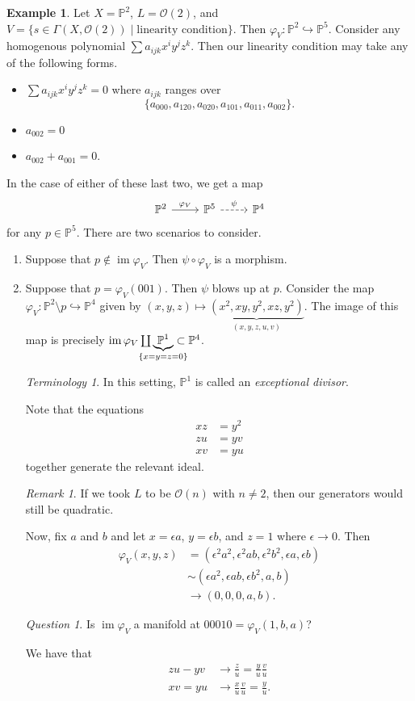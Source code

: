 \documentclass[10pt,letterpaper,cm]{nupset}
\theoremstyle{definition}
\newtheorem{exmp}[defn]{Example}
\theoremstyle{theorem}
\theoremstyle{remark}
\newtheorem{remark}[defn]{Remark}
\newtheorem*{question}{Question}
\newtheorem*{term}{Terminology}
\renewcommand{\O}{\mathcal O}
\renewcommand{\P}{\mathbb P}
\newcommand{\1}{\mathbb{1}}
\newcommand{\0}{\vec 0}
\DeclareMathOperator{\im}{im}
\newcommand{\bi}{\begin{itemize}}
\newcommand{\ei}{\end{itemize}}
\newcommand{\be}{\begin{enumerate}}
\newcommand{\ee}{\end{enumerate}}
\begin{document}
\begin{exmp}
Let $X = \P^2$, $L = \O(2)$, and $V = \{s\in \Gamma\left(X, \O(2)\right) \mid \text{linearity condition}\}$. Then $\varphi_V : \P^2 \hookrightarrow \P^5$. Consider any homogenous polynomial $\sum a_{ijk}x^iy^jz^k$. Then our linearity condition may take any of the following forms. 
\bi
\item $\sum a_{ijk}x^iy^jz^k =0$ where $a_{ijk}$ ranges over
\[
\{a_{000}, a_{120}, a_{020}, a_{101}, a_{011}, a_{002}\}.
\] 
\item $a_{002}=0$ 
\item $a_{002} +a_{001} =0$.
\ei
In the case of either of these last two, we get a map 
\[ \begin{tikzcd}
\P^2 \arrow[r, "\varphi_V"] & \P^5 \arrow[r, "\psi", dashed] & \P^4
\end{tikzcd}
\] for any $p\in \P^5$. There are two scenarios to consider.
\be[label = (\alph*)]
\item Suppose that $p \notin \im{\varphi_V}$. Then $\psi \circ \varphi_V$ is a morphism.
\item Suppose that $p = \varphi_V\left(001\right)$. Then $\psi$ blows up at $p$. Consider the map $\varphi_V : \P^2\setminus p \hookrightarrow \P^4$ given by $\left(x,y,z\right) \mapsto \underbrace{\left(x^2, xy, y^2, xz, y^2\right)}_{\left(x,y,z,u,v\right)}$. The image of this map is precisely $\im{\varphi_V} \coprod \underbrace{\P^1}_{\mathclap{\{x=y=z=0\}}} \subset \P^4$.
\begin{term}
In this setting, $\P^1$ is called an \textit{exceptional divisor}.
\end{term}
Note that the equations
\begin{align*}
xz & = y^2
\\ zu & = yv
\\ xv & = yu
\end{align*} together generate the relevant ideal.
\begin{remark}
If we took $L$ to be $\O(n)$ with $n\ne 2$, then our generators would still be quadratic.
\end{remark}
Now, fix $a$ and $b$ and let $x=\epsilon{a}$, $y=\epsilon{b}$, and $z=1$ where $\epsilon \to 0$. Then 
\begin{align*}
\varphi_V(x,y,z) & = \left(\epsilon^2a^2, \epsilon^2ab, \epsilon^2 b^2, \epsilon{a}, \epsilon{b}\right) 
\\ & \sim \left(\epsilon a^2, \epsilon{ab}, \epsilon{b^2}, a, b\right) 
\\ & \to \left(0,0,0,a,b\right).
\end{align*}
\begin{question}
Is $\im{\varphi_V}$ a manifold at $00010 = \varphi_V(1,b,a)$?
\end{question}
We have that
\begin{align*}
zu - yv & \to \frac{z}{u} = \frac{y}{u}\frac{v}{u}
\\ xv = yu & \to \frac{x}{u}\frac{v}{u} = \frac{y}{u}.
\end{align*}
\ee
\end{exmp}
\end{document}
